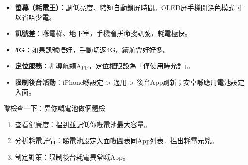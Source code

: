 
\begin{itemize}
  \item \textbf{螢幕（耗電王）}：調低亮度、縮短自動鎖屏時間。OLED屏手機開深色模式可以省唔少電。
  \item \textbf{訊號差}：喺電梯、地下室，手機會拼命搜訊號，耗電極快。
  \item \textbf{5G}：如果訊號唔好，手動切返4G，續航會好好多。
  \item \textbf{定位服務}：非導航類App，定位權限設為「僅使用時允許」。
  \item \textbf{限制後台活動}：iPhone喺設定 > 通用 > 後台App刷新；安卓喺應用電池設定入面。
\end{itemize}

\begin{tcbpractice}{嚟檢查一下：畀你嘅電池做個體檢}
\begin{enumerate}
  \item 查看健康度：揾到並記低你嘅電池最大容量。
  \item 分析耗電詳情：睇電池設定入面嘅圖表同App列表，揾出耗電元兇。
  \item 制定對策：限制後台耗電異常嘅App。
\end{enumerate}

\end{tcbpractice}
